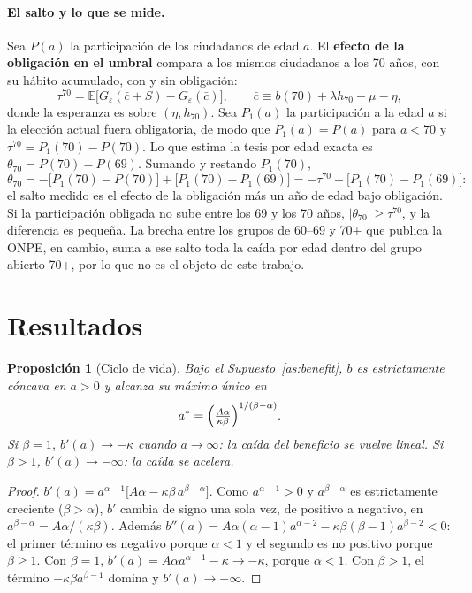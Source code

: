 \documentclass[11pt]{article}
\newtheorem{proposition}{Proposición}
\theoremstyle{definition}
\newcommand{\E}{\mathbb{E}}
\newcommand{\1}{\mathbbm{1}}
\begin{document}
\paragraph{El salto y lo que se mide.} Sea $P(a)$ la participación de los ciudadanos de edad $a$.
El \textbf{efecto de la obligación en el umbral} compara a los mismos ciudadanos a los 70 años, con
su hábito acumulado, con y sin obligación:
\begin{equation}\label{eq:tau}
  \tau^{70}=\E\bigl[G_\varepsilon(\bar c+S)-G_\varepsilon(\bar c)\bigr],\qquad
  \bar c\equiv b(70)+\lambda h_{70}-\mu-\eta ,
\end{equation}
donde la esperanza es sobre $(\eta,h_{70})$. Sea $P_1(a)$ la participación a la edad $a$ si la
elección actual fuera obligatoria, de modo que $P_1(a)=P(a)$ para $a<70$ y
$\tau^{70}=P_1(70)-P(70)$. Lo que estima la tesis por edad exacta es $\theta_{70}=P(70)-P(69)$.
Sumando y restando $P_1(70)$,
\begin{equation}\label{eq:theta}
  \theta_{70}=-\bigl[P_1(70)-P(70)\bigr]+\bigl[P_1(70)-P_1(69)\bigr]=-\tau^{70}+\bigl[P_1(70)-P_1(69)\bigr]:
\end{equation}
el salto medido es el efecto de la obligación más un año de edad bajo obligación. Si la participación
obligada no sube entre los 69 y los 70 años, $|\theta_{70}|\ge\tau^{70}$, y la diferencia es pequeña.
La brecha entre los grupos de 60--69 y 70+ que publica la ONPE, en cambio, suma a ese salto toda la
caída por edad dentro del grupo abierto 70+, por lo que no es el objeto de este trabajo.

\section{Resultados}\label{sec:results}

\begin{proposition}[Ciclo de vida]\label{prop:lifecycle}
Bajo el Supuesto~\ref{as:benefit}, $b$ es estrictamente cóncava en $a>0$ y alcanza su máximo
único en
\[
  a^*=\Bigl(\tfrac{A\alpha}{\kappa\beta}\Bigr)^{1/(\beta-\alpha)} .
\]
Si $\beta=1$, $b'(a)\to-\kappa$ cuando $a\to\infty$: la caída del beneficio se vuelve lineal. Si
$\beta>1$, $b'(a)\to-\infty$: la caída se acelera.
\end{proposition}

\begin{proof}
$b'(a)=a^{\alpha-1}\bigl[A\alpha-\kappa\beta\,a^{\beta-\alpha}\bigr]$. Como $a^{\alpha-1}>0$ y
$a^{\beta-\alpha}$ es estrictamente creciente ($\beta>\alpha$), $b'$ cambia de signo una sola vez,
de positivo a negativo, en $a^{\beta-\alpha}=A\alpha/(\kappa\beta)$. Además
$b''(a)=A\alpha(\alpha-1)a^{\alpha-2}-\kappa\beta(\beta-1)a^{\beta-2}<0$: el primer término es
negativo porque $\alpha<1$ y el segundo es no positivo porque $\beta\ge1$. Con $\beta=1$,
$b'(a)=A\alpha a^{\alpha-1}-\kappa\to-\kappa$, porque $\alpha<1$. Con $\beta>1$, el término
$-\kappa\beta a^{\beta-1}$ domina y $b'(a)\to-\infty$.
\end{proof}
\end{document}

